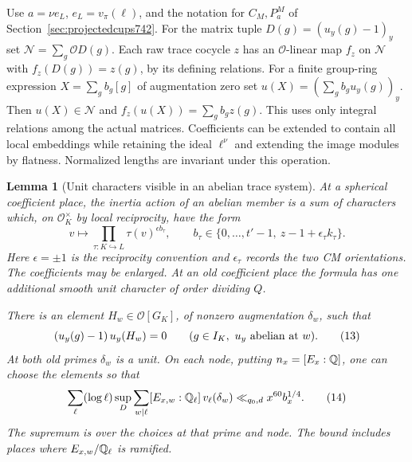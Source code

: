\documentclass[a4paper,11pt]{article}
\newtheorem{lemma}[proposition]{Lemma}
\theoremstyle{definition}
\theoremstyle{remark}
\numberwithin{equation}{section}
\begin{document}
Use \(a=\nu e_L\), \(e_L=v_\pi(\ell)\), and the notation for
\(C_M,P_a^M\) of Section~\ref{sec:projectedcups742}. For the
matrix tuple \(D(g)=(u_y(g)-1)_y\) set
\(\mathcal N=\sum_g\mathcal O D(g)\). Each raw trace cocycle
\(z\) has an \(\mathcal O\)-linear map \(f_z\) on \(\mathcal N\)
with \(f_z(D(g))=z(g)\), by its defining relations. For a
finite group-ring expression \(X=\sum_g b_g[g]\) of augmentation
zero set \(u(X)=(\sum_g b_g u_y(g))_y\). Then \(u(X)\in\mathcal N\)
and \(f_z(u(X))=\sum_g b_gz(g)\). This uses only integral
relations among the actual matrices. Coefficients can be extended
to contain all local embeddings while retaining the ideal
\(\ell^\nu\) and extending the image modules by flatness.
Normalized lengths are invariant under this operation.

\begin{lemma}[Unit characters visible in an abelian trace system]
\leavevmode\label{lem:abelianunits744}
At a spherical coefficient place, the inertia action of an
abelian member is a sum of characters which, on
\(\mathcal O_K^\times\) by local reciprocity, have the form
\[
        v\longmapsto\prod_{\tau:K\hookrightarrow L}
                             \tau(v)^{\epsilon b_\tau},
   \qquad
   b_\tau\in\{0,\ldots,t'-1,\ z-1+\epsilon_\tau k_\tau\}.
 \tag{12}\label{eq:unitweights744}
\]
Here \(\epsilon=\pm1\) is the reciprocity convention and
\(\epsilon_\tau\) records the two CM orientations. The coefficients
may be enlarged. At an old coefficient place the formula has one
additional smooth unit character of order dividing \(Q\).

There is an element \(H_w\in\mathcal O[G_K]\), of nonzero
augmentation \(\delta_w\), such that
\[
        (u_y(g)-1)\,u_y(H_w)=0
             \qquad(g\in I_K,\ u_y\ {\rm abelian\ at}\ w).
 \tag{13}\label{eq:abelianann744}
\]
At both old primes \(\delta_w\) is a unit. On each node,
putting \(n_x=[E_x:\mathbb Q]\), one can choose the elements so that
\[
 \sum_\ell(\log\ell)
       \sup_D\sum_{w\mid\ell}[E_{x,w}:\mathbb Q_\ell]\,v_\ell(\delta_w)
            \ll_{q_0,d} x^{60} b_x^{1/4}.
 \tag{14}\label{eq:unitbound744}
\]
The supremum is over the choices at that prime and node. The
bound includes places where \(E_{x,w}/\mathbb Q_\ell\) is ramified.
\end{lemma}
\end{document}
